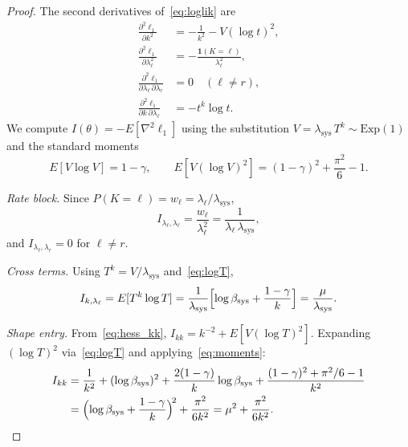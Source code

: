 \documentclass[12pt]{article}
\theoremstyle{remark}
\newcommand{\lsys}{\lambda_{\mathrm{sys}}}
\newcommand{\bsys}{\beta_{\mathrm{sys}}}
\newcommand{\ind}{\mathbf{1}}
\begin{document}
\begin{proof}
The second derivatives of~\eqref{eq:loglik} are
%
\begin{align}
\frac{\partial^2 \ell_1}{\partial k^2}
  &= -\frac{1}{k^2} - V(\log t)^2,
  \label{eq:hess_kk} \\
\frac{\partial^2 \ell_1}{\partial \lambda_\ell^2}
  &= -\frac{\ind(K = \ell)}{\lambda_\ell^2},
  \label{eq:hess_ll} \\
\frac{\partial^2 \ell_1}{\partial \lambda_\ell \,\partial \lambda_r}
  &= 0 \quad (\ell \neq r),
  \label{eq:hess_lr} \\
\frac{\partial^2 \ell_1}{\partial k\,\partial \lambda_\ell}
  &= -t^k \log t.
  \label{eq:hess_kl}
\end{align}
%
We compute $I(\theta) = -E[\nabla^2 \ell_1]$ using the substitution
$V = \lsys\,T^k \sim \mathrm{Exp}(1)$ and the standard moments
%
\begin{equation}\label{eq:moments}
E[V \log V] = 1 - \gamma, \qquad
E[V(\log V)^2] = (1-\gamma)^2 + \frac{\pi^2}{6} - 1.
\end{equation}

\textit{Rate block.}\enspace
Since $P(K = \ell) = w_\ell = \lambda_\ell/\lsys$,
\[
I_{\lambda_\ell,\lambda_\ell}
= \frac{w_\ell}{\lambda_\ell^2}
= \frac{1}{\lambda_\ell\,\lsys},
\]
and $I_{\lambda_\ell,\lambda_r} = 0$ for $\ell \neq r$.

\textit{Cross terms.}\enspace
Using $T^k = V/\lsys$ and~\eqref{eq:logT},
\[
I_{k,\lambda_\ell}
= E[T^k \log T]
= \frac{1}{\lsys}\Bigl[
  \log \bsys + \frac{1-\gamma}{k}
\Bigr]
= \frac{\mu}{\lsys}.
\]

\textit{Shape entry.}\enspace
From~\eqref{eq:hess_kk},
$I_{kk} = k^{-2} + E[V(\log T)^2]$.
Expanding $(\log T)^2$ via~\eqref{eq:logT} and
applying~\eqref{eq:moments}:
%
\begin{align}
I_{kk}
&= \frac{1}{k^2}
 + (\log \bsys)^2
 + \frac{2(1-\gamma)}{k}\log \bsys
 + \frac{(1-\gamma)^2 + \pi^2/6 - 1}{k^2}
\notag\\
&= \Bigl(\log \bsys + \frac{1-\gamma}{k}\Bigr)^{\!2}
 + \frac{\pi^2}{6k^2}
= \mu^2 + \frac{\pi^2}{6k^2}.
\tag*{\qedhere}
\end{align}
\end{proof}
\end{document}
